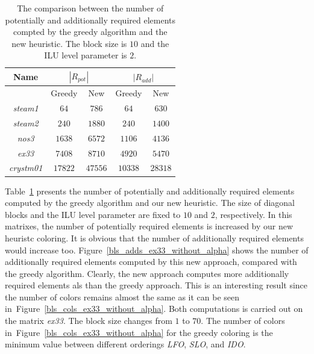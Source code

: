 \documentclass[11pt, twoside,a4paper]{book}
\newcommand{\figref}[1]{Figure~\protect\ref{#1}}
\begin{document}
\begin{table}
\centering
\begin{tabular}{|c|c|c|c|c|}
\hline
Name & \multicolumn{2}{c|}{$|R_{pot}|$} & \multicolumn{2}{c|}{$|R_{add}|$}\\\hline
{} & Greedy & New & Greedy & New\\\hline
\textit{steam1} & $64$ & $786$ & $64$ & $630$ \\\hline
\textit{steam2} & $240$ & $1880$ & $240$ & $1400$ \\\hline
\textit{nos3} & $1638$ & $6572$ & $1106$ & $4136$ \\\hline
\textit{ex33} & $7408$ & $8710$ & $4920$ & $5470$\\\hline
\textit{crystm01} & $17822$ & $47556$& $10338$ & $28318$\\\hline
\end{tabular}
\caption{The comparison between the number of potentially and additionally required
elements compted by the greedy algorithm and the new heuristic.
The block size is $10$ and the ILU level parameter is $2$.}
\label{mats.pot.add.gr.vs.nreq}
\end{table}

Table~\ref{mats.pot.add.gr.vs.nreq} presents the number of potentially
and additionally required elements computed
by the greedy algorithm and our new heuristic. The size of diagonal blocks
and the ILU level parameter are fixed to $10$ and $2$, respectively.
In this matrixes, the number of potentially required elements is increased
by our new heuristc coloring.
It is obvious that the number of additionally required elements would increase too.
\figref{bls_adds_ex33_without_alpha} shows the number of additionally required elements
computed by this new approach, compared with the greedy algorithm. Clearly,
the new approach computes more additionally required elements als than the greedy approach.
This is an interesting result since the number of colors remains almost the same
as it can be seen in~\figref{bls_cols_ex33_without_alpha}.
Both computations is carried out on the matrix \textit{ex33}. The block size changes
from $1$ to $70$. The number of colors in~\figref{bls_cols_ex33_without_alpha} for the greedy coloring
is the minimum value between different orderings \textit{LFO}, \textit{SLO}, and \textit{IDO}.
\end{document}
